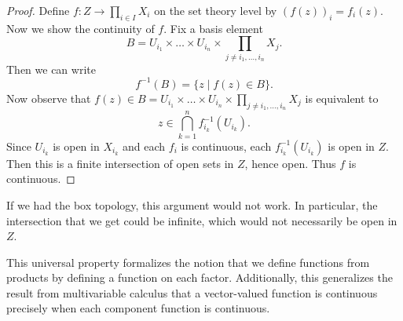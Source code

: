 \begin{proof}
  Define $f : Z \to \prod_{i \in I} X_i$ on the
  set theory level by $(f(z))_i = f_i(z)$. Now we
  show the continuity of $f$. Fix a basis
  element
  \[
    B = U_{i_1} \times \dots \times U_{i_n} \times
    \prod_{j \ne i_1, \dots, i_n} X_j.
  \]
  Then we can write
  \[
    f^{-1}(B) = \{z \mid f(z) \in B\}.
  \]
  Now observe that $f(z) \in B = U_{i_1} \times \dots \times U_{i_n} \times \prod_{j \ne i_1, \dots, i_n} X_j$
  is equivalent to
  \[
    z \in \bigcap_{k = 1}^n f_{i_k}^{-1}(U_{i_k}).
  \]
  Since $U_{i_k}$ is open in $X_{i_k}$ and
  each $f_i$ is continuous, each
  $f_{i_k}^{-1}(U_{i_k})$ is open in $Z$.
  Then this is a finite intersection of open
  sets in $Z$, hence open. Thus $f$ is continuous.
\end{proof}

\begin{remark}
  If we had the box topology, this argument
  would not work. In particular, the intersection
  that we get could be infinite, which would
  not necessarily be open in $Z$.
\end{remark}

\begin{remark}
  This universal property formalizes the notion that
  we define functions from products by defining
  a function on each factor. Additionally, this
  generalizes the result from multivariable calculus
  that a vector-valued function is continuous
  precisely when each component function is continuous.
\end{remark}
